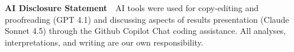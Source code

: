 \noindent\textbf{AI Disclosure Statement}\ \
AI tools were used for copy-editing and proofreading (GPT 4.1) and discussing aspects of results presentation (Claude Sonnet 4.5) through the Github Copilot Chat coding assistance.
All analyses, interpretations, and writing are our own responsibility.
